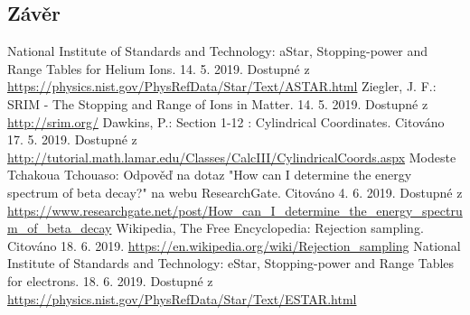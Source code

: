 \documentclass[11pt,a4paper]{article}
\begin{document}
\subsection{Závěr}
\begin{thebibliography}{Mm99}
	 National Institute of Standards and Technology: aStar, Stopping-power and Range Tables for Helium Ions. 14. 5. 2019. Dostupné z \url{https://physics.nist.gov/PhysRefData/Star/Text/ASTAR.html}
	 Ziegler, J. F.: SRIM - The Stopping and Range of Ions in Matter. 14. 5. 2019. Dostupné z \url{http://srim.org/} 
	 Dawkins, P.: Section 1-12 : Cylindrical Coordinates. Citováno 17. 5. 2019. Dostupné z \url{http://tutorial.math.lamar.edu/Classes/CalcIII/CylindricalCoords.aspx}
	 Modeste Tchakoua Tchouaso: Odpověď na dotaz "How can I determine the energy spectrum of beta decay?" na webu ResearchGate. Citováno 4. 6. 2019. Dostupné z  \url{https://www.researchgate.net/post/How_can_I_determine_the_energy_spectrum_of_beta_decay}
	 Wikipedia, The Free Encyclopedia: Rejection sampling. Citováno 18. 6. 2019. \url{https://en.wikipedia.org/wiki/Rejection_sampling}
	 National Institute of Standards and Technology: eStar, Stopping-power and Range Tables for electrons. 18. 6. 2019. Dostupné z \url{https://physics.nist.gov/PhysRefData/Star/Text/ESTAR.html}
\end{thebibliography}
\end{document}
